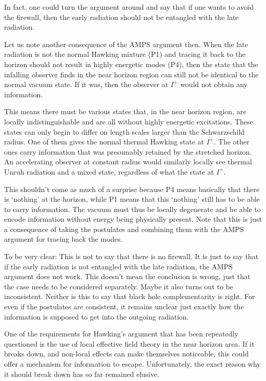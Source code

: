 \documentclass[12pt]{article}
\begin{document}
In fact, one could turn the argument around
and say that if one wants to avoid the firewall, then the early radiation
should not be entangled with the late radiation.

Let us note another consequence of the {\sc AMPS} argument then. When
the late radiation is not the normal Hawking mixture (P1) and tracing it
back to the horizon should not result in
highly energetic modes (P4), then the state that the infalling observer finds
in the near horizon region can still not be identical to the normal vacuum
state. If it was, then the observer at $I^+$ would not obtain any information.

This means
there must be various states that, in the near horizon region,
are locally indistinguishable and are all without highly energetic excitations. 
These states can only begin to differ on length scales larger than the 
Schwarzschild radius. One of them gives the normal thermal Hawking state
at $I^+$. The other ones carry information that was presumably retained
by the stretched horizon. An accelerating observer at constant
radius would similarly locally see thermal Unruh radiation and a 
mixed state, regardless of what the state at $I^+$. 

This shouldn't come as much of a surprise because P4 means
basically that there is `nothing' at the horizon, while P1 means that this
`nothing' still has to be able to carry information. The vacuum must
thus be locally degenerate and be able to encode information without
energy being physically present. Note that this is just a consequence
of taking the postulates and combining them with the {\sc AMPS} argument
for tracing back the modes. 

To be very clear: This is not to say that there is no firewall. It is
just to say that if the early radiation is not entangled with
the late radiation, the {\sc AMPS} argument does not work. This doesn't mean
the conclusion is wrong, just that the case needs to be considered
separately. Maybe it also turns out to be inconsistent. Neither is
this to say that black hole complementarity is right. For even if
the postulates are consistent, it remains unclear just exactly how 
the information is supposed to get into the outgoing radiation. 

One of the requirements for Hawking's argument that has
been repeatedly questioned \cite{Lowe:2006xm,Giddings:2007pj} is the 
use of local effective field theory in the near horizon area. If it breaks down,
and non-local effects can make themselves noticeable, this could
offer a mechanism for information to escape. Unfortunately,
the exact reason why it should break down has so far remained
elusive. 
\end{document}
